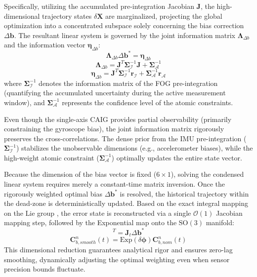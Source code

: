 \documentclass[journal]{IEEEtran}
\newcommand{\SO}{\mathrm{SO}}
\newcommand{\Exp}{\mathrm{Exp}}
\begin{document}
	Specifically, utilizing the accumulated pre-integration Jacobian $\bm{J}$, the high-dimensional trajectory states $\delta \bm{X}$ are marginalized, projecting the global optimization into a concentrated subspace solely concerning the bias correction $\Delta \bm{b}$. The resultant linear system is governed by the joint information matrix $\bm{\Lambda}_{\Delta b}$ and the information vector $\bm{\eta}_{\Delta b}$:
	\begin{equation}
		\bm{\Lambda}_{\Delta b} \Delta \bm{b}^* = \bm{\eta}_{\Delta b}
	\end{equation}
	\begin{equation}
		\bm{\Lambda}_{\Delta b} = \bm{J}^T \bm{\Sigma}_{\mathcal{I}}^{-1} \bm{J} + \bm{\Sigma}_{\mathcal{A}}^{-1}
	\end{equation}
	\begin{equation}
		\bm{\eta}_{\Delta b} = \bm{J}^T \bm{\Sigma}_{\mathcal{I}}^{-1} \bm{r}_{\mathcal{I}} + \bm{\Sigma}_{\mathcal{A}}^{-1} \bm{r}_{\mathcal{A}}
	\end{equation}
	where $\bm{\Sigma}_{\mathcal{I}}^{-1}$ denotes the information matrix of the FOG pre-integration (quantifying the accumulated uncertainty during the active measurement window), and $\bm{\Sigma}_{\mathcal{A}}^{-1}$ represents the confidence level of the atomic constraints. 
	
	Even though the single-axis CAIG provides partial observability (primarily constraining the gyroscope bias), the joint information matrix rigorously preserves the cross-correlations. The dense prior from the IMU pre-integration ($\bm{\Sigma}_{\mathcal{I}}^{-1}$) stabilizes the unobservable dimensions (e.g., accelerometer biases), while the high-weight atomic constraint ($\bm{\Sigma}_{\mathcal{A}}^{-1}$) optimally updates the entire state vector.
	
	Because the dimension of the bias vector is fixed ($6 \times 1$), solving the condensed linear system requires merely a constant-time matrix inversion. Once the rigorously weighted optimal bias $\Delta \bm{b}^*$ is resolved, the historical trajectory within the dead-zone is deterministically updated. Based on the exact integral mapping on the Lie group \cite{b5}, the error state is reconstructed via a single $\mathcal{O}(1)$ Jacobian mapping step, followed by the Exponential map onto the $\SO(3)$ manifold:
	\begin{equation}
		[\delta \bm{\phi}^T, \delta \bm{v}^T, \delta \bm{p}^T]^T = \bm{J}_t \Delta \bm{b}^*
	\end{equation}
	\begin{equation}
		\bm{C}_{b, smooth}^n(t) = \Exp(\delta \bm{\phi}) \bm{C}_{b, nom}^n(t)
	\end{equation}
	This dimensional reduction guarantees analytical rigor and ensures zero-lag smoothing, dynamically adjusting the optimal weighting even when sensor precision bounds fluctuate.
	
\end{document}
